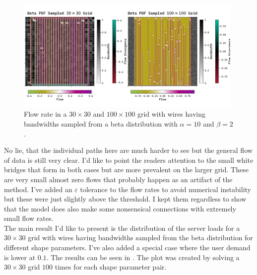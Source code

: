 \documentclass[10pt, titlepage, a4paper]{article}
\begin{document}
\begin{figure}[H]
    \centering
    \includegraphics[width=0.98\textwidth]{../Images/optimize-30-100.pdf}
    \caption{Flow rate in a $30\times 30$ and $100\times 100$ grid with wires having bandwidths sampled from a beta distribution with $\alpha = 10$ and $\beta = 2$.}
    \label{fig:opt-30-100}  
\end{figure}

No lie, that the individual paths here are much harder to see but the general flow of data is still very clear. I'd like to 
point the readers attention to the small white bridges that form in both cases but are more prevalent on the larger grid. These are 
very small almost zero flows that probably happen as an artifact of the method. I've added an $\varepsilon$ tolerance 
to the flow rates to avoid numerical instability but these were just slightly above the threshold. I kept them regardless to 
show that the model does also make some nonsensical connections with extremely small flow rates. \\

The main result I'd like to present is the distribution of the server loads for a $30\times 30$ grid with wires having bandwidths
sampled from the beta distribution for different shape parameters. I've also added a special case where the user demand is lower at $0.1$. The results can be seen in
\textcolor{red}{}. The plot was created by solving a $30\times 30$ grid $100$ times for each shape parameter pair.
\end{document}
